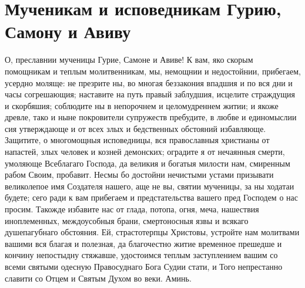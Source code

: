 \section{Мученикам и исповедникам Гурию, Самону и Авиву}\begin{mymulticols}





О, преславнии мученицы Гурие, Самоне и Авиве! К вам, яко скорым помощникам и теплым молитвенникам, мы, немощнии и недостойнии, прибегаем, усердно моляще: не презрите ны, во многая беззакония впадшия и по вся дни и часы согрешающия; наставите на путь правый заблудшия, исцелите страждущия и скорбяшия; соблюдите ны в непорочнем и целомудреннем житии; и якоже древле, тако и ныне покровители супружеств пребудите, в любве и единомыслии сия утверждающе и от всех злых и бедственных обстояний избавляюще. Защитите, о многомощныя исповедницы, вся православныя христианы от напастей, злых человек и козней демонских; оградите я от нечаянныя смерти, умоляюще Всеблагаго Господа, да великия и богатыя милости нам, смиренным рабом Своим, пробавит. Несмы бо достойни нечистыми устами призывати великолепое имя Создателя нашего, аще не вы, святии мученицы, за ны ходатаи будете; сего ради к вам прибегаем и предстательства вашего пред Господем о нас просим. Такожде избавите нас от глада, потопа, огня, меча, нашествия иноплеменных, междоусобныя брани, смертоносныя язвы и всякаго душепагубнаго обстояния. Ей, страстотерпцы Христовы, устройте нам молитвами вашими вся благая и полезная, да благочестно житие временное прешедше и кончину непостыдну стяжавше, удостоимся теплым заступлением вашим со всеми святыми одесную Правосуднаго Бога Судии стати, и Того непрестанно славити со Отцем и Святым Духом во веки. Аминь.

\end{mymulticols}

\mychapterending






